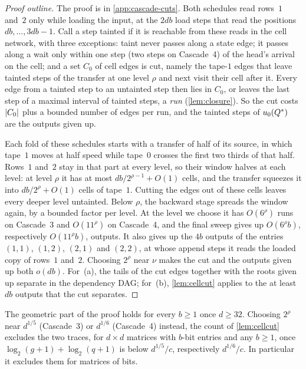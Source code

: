 \begin{proof}[Proof outline]
The proof is in \cref{app:cascade-cuts}. Both schedules read rows~$1$ and~$2$ only while loading the input, at the $2db$ load steps
that read the positions $db,\dots,3db-1$. Call a step tainted if it is reachable from these reads in the cell network, with three
exceptions: taint never passes along a state edge; it passes along a wait only within one step (two steps on Cascade~4) of the head's
arrival on the cell; and a set $C_0$ of cell edges is cut, namely the tape-$1$ edges that leave tainted steps of the transfer at one level
$\rho$ and next visit their cell after it. Every edge from a tainted step to an untainted step then lies in $C_0$, or
leaves the last step of a maximal interval of tainted steps, a \emph{run} (\cref{lem:closure}). So the cut costs $\lvert C_0 \rvert$ plus a
bounded number of edges per run, and the tainted steps of $u_0(Q^{*})$ are the outputs given up.

Each fold of these schedules starts with a transfer of half of its source, in which tape~$1$ moves at half speed while tape~$0$ crosses
the first two thirds of that half. Rows~$1$ and~$2$ stay in that part at every level, so their window halves at each level: at level
$\rho$ it has at most $db/2^{\rho-1}+O(1)$ cells, and the transfer squeezes it into $db/2^\rho+O(1)$ cells of tape~$1$. Cutting the edges
out of these cells leaves every deeper level untainted. Below $\rho$, the backward stage
spreads the window again, by a bounded factor per level. At the level we choose it has $O(6^\rho)$ runs on Cascade~3 and $O(11^\rho)$
on Cascade~4, and the final sweep gives up $O(6^\rho b)$, respectively $O(11^\rho b)$, outputs. It also gives up the $4b$ outputs of
the entries $(1,1)$, $(1,2)$, $(2,1)$ and $(2,2)$, at whose append steps it reads the loaded copy of rows~$1$ and~$2$. Choosing $2^\rho$
near $\nu$ makes the cut and the outputs given up both $o(db)$. For~(a), the tails of the cut edges together with the roots given up
separate in the dependency DAG; for~(b), \cref{lem:cellcut} applies to the at least $db$ outputs that the cut separates.
\end{proof}

\begin{remark}\label{rem:cascade-widths}
The geometric part of the proof holds for every $b\ge1$ once $d\ge32$. Choosing $2^\rho$ near $d^{1/5}$ (Cascade~3) or $d^{1/6}$
(Cascade~4) instead, the count of \cref{lem:cellcut} excludes the two traces, for $d\times d$ matrices with $b$-bit entries and any
$b\ge1$, once $\log_2(g+1)+\log_2(q+1)$ is below $d^{1/5}/c$, respectively $d^{1/6}/c$. In particular it excludes them for matrices of
bits.
\end{remark}

